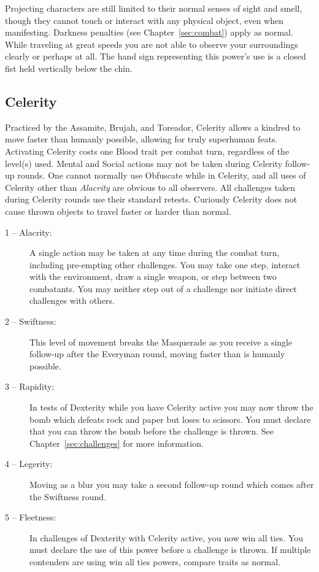\begin{description}
	Projecting characters are still limited to their normal senses of sight and smell, though 
	they cannot touch or interact with any physical object, even when manifesting.  Darkness 
	penalties (see Chapter~\ref{sec:combat}) apply as normal.  While traveling at great speeds 
	you are not able to observe your surroundings clearly or perhaps at all.  The hand sign 
	representing this power's use is a closed fist held vertically below the chin.
\end{description}

\subsection{Celerity}
Practiced by the Assamite, Brujah, and Toreador, Celerity allows a kindred to move 
faster than humanly possible, allowing for truly superhuman feats.  Activating Celerity 
costs one Blood trait per combat turn, regardless of the level(s) used.  Mental and Social 
actions may not be taken during Celerity follow-up rounds.  One cannot normally use Obfuscate 
while in Celerity, and all uses of Celerity other than \emph{Alacrity} are obvious to all 
observers.  All challenges taken during Celerity rounds use their standard retests.  Curiously 
Celerity does not cause thrown objects to travel faster or harder than normal.

\begin{description}
	\item[1 -- Alacrity:]  A single action may be taken at any time during the combat turn, 
	including pre-empting other challenges.  You may take one step, interact with 
	the environment, draw a single weapon, or step between two combatants.  You may neither 
	step out of a challenge nor initiate direct challenges with others.
	\item[2 -- Swiftness:]  This level of movement breaks the Masquerade as you 
	receive a single follow-up after the Everyman round, moving faster than is humanly 
	possible.
	\item[3 -- Rapidity:]  In tests of Dexterity while you have Celerity active you 
	may now throw the bomb which defeats rock and paper but loses to scissors.  You 
	must declare that you can throw the bomb before the challenge is thrown.  See 
	Chapter~\ref{sec:challenges} for more information.
	\item[4 -- Legerity:]  Moving as a blur you may take a second follow-up round 
	which comes after the Swiftness round.
	\item[5 -- Fleetness:]  In challenges of Dexterity with Celerity active, you now 
	win all ties.  You must declare the use of this power before a challenge is thrown.  
	If multiple contenders are using win all ties powers, compare traits as normal.
\end{description}

